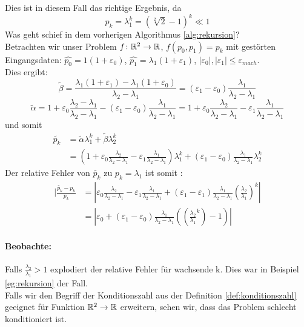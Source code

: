 

Dies ist in diesem Fall das richtige Ergebnis, da
\[
p_k=\lambda_1^{k}=(\sqrt[2]{2}-1)^{k} \ll 1 
\]
Was geht schief in dem vorherigen Algorithmus \ref{alg:rekursion}? \\
Betrachten wir unser Problem $f \colon \mathbb{R}^2 \to \mathbb{R}$, $f(p_0,p_1)=p_k$ mit gestörten Eingangsdaten: $\hat{p_0}= 1(1+\varepsilon_0)$, $\hat{p_1}= \lambda_1(1+\varepsilon_1)$, $|\varepsilon_0|, |\varepsilon_1|\le \varepsilon_{mach}$.\\
Dies ergibt:
\[
\tilde{\beta} = \frac{\lambda_1(1+\varepsilon_1)-\lambda_1(1+\varepsilon_0)}{\lambda_2-\lambda_1}= (\varepsilon_1-\varepsilon_0) \frac{\lambda_1}{\lambda_2-\lambda_1}
\]
\[
\tilde{\alpha} = 1+ \varepsilon_0 \frac{\lambda_2-\lambda_1}{\lambda_2-\lambda_1}-(\varepsilon_1-\varepsilon_0) \frac{\lambda_1}{\lambda_2-\lambda_1}= 1+\varepsilon_0 \frac{\lambda_2}{\lambda_2-\lambda_1}- \varepsilon_1 \frac{\lambda_1}{\lambda_2-\lambda_1}
\]
und somit
\begin{align*}
\tilde{p_k} 
&= \tilde{\alpha} \lambda_1^{k}+ \tilde{\beta} \lambda_2^{k}\\
&=(1+\varepsilon_0 \frac{\lambda_2}{\lambda_2-\lambda_1}-\varepsilon_1 \frac{\lambda_1}{\lambda_2-\lambda_1})\lambda_1^{k}+(\varepsilon_1 -\varepsilon_0) \frac{\lambda_1}{\lambda_2-\lambda_1} \lambda_2^{k}
\end{align*}
Der relative Fehler von $\tilde{p_k}$ zu $p_k= \lambda_1$ ist somit :
\begin{align*}
	|\frac{\tilde{p_k}-p_k}{p_k}
	&= |\varepsilon_0 \frac{\lambda_2}{\lambda_2-\lambda_1} -\varepsilon_1 \frac{\lambda_1}{\lambda_2-\lambda_1} + (\varepsilon_1-\varepsilon_1) \frac{\lambda_1}{\lambda_2-\lambda_1}(\frac{\lambda_2}{\lambda_1})^{k}| \\
	&= | \varepsilon_0 + (\varepsilon_1-\varepsilon_0) \frac{\lambda_1}{\lambda_2-\lambda_1} \left( \left( \frac{\lambda_2}{\lambda_1}^{k} \right)-1 \right)|
\end{align*}
\paragraph{Beobachte:}Falls $\frac{\lambda_2}{\lambda_1}>1$ explodiert der relative Fehler für wachsende k. Dies war in Beispiel \ref{eg:rekursion} der Fall. \\
Falls wir den Begriff der Konditionszahl aus der Definition \ref{def:konditionszahl} geeignet für Funktion $\mathbb{R}^2 \to \mathbb{R}$ erweitern, sehen wir, dass das Problem schlecht konditioniert ist.

